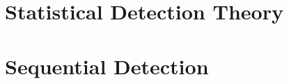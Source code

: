 \documentclass[graybox,envcountchap,sectrefs]{svmono_mod}
\begin{document}
%

\chapter{Statistical Detection Theory}
\minitoc
\label{ch:SDT}



\chapter{Sequential Detection}
\label{sec:seq_det}

%


%


\backmatter%
%
%
\printindex
\end{document}
